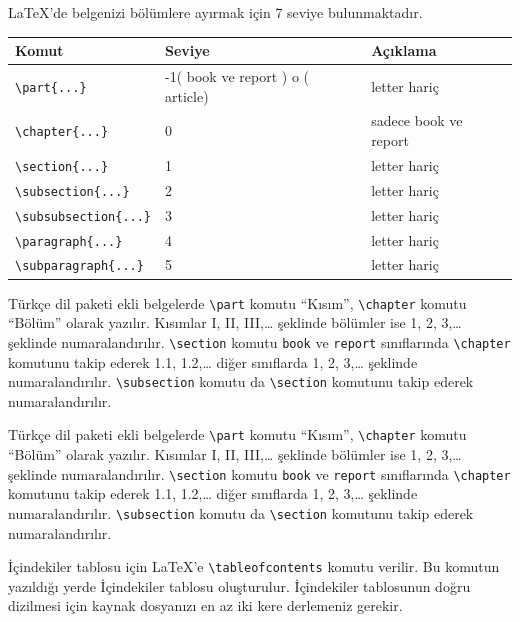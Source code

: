 \documentclass[
  10pt,
]{scrbook}
\begin{document}
LaTeX'de belgenizi bölümlere ayırmak için 7 seviye bulunmaktadır.

\begin{longtable}[]{@{}lll@{}}
\toprule
Komut & Seviye & Açıklama \\
\midrule
\endhead
\texttt{\textbackslash{}part\{...\}} & -1( book ve report ) o ( article) & letter hariç \\
\texttt{\textbackslash{}chapter\{...\}} & 0 & sadece book ve report \\
\texttt{\textbackslash{}section\{...\}} & 1 & letter hariç \\
\texttt{\textbackslash{}subsection\{...\}} & 2 & letter hariç \\
\texttt{\textbackslash{}subsubsection\{...\}} & 3 & letter hariç \\
\texttt{\textbackslash{}paragraph\{...\}} & 4 & letter hariç \\
\texttt{\textbackslash{}subparagraph\{...\}} & 5 & letter hariç \\
\bottomrule
\end{longtable}

Türkçe dil paketi ekli belgelerde \texttt{\textbackslash{}part} komutu ``Kısım'', \texttt{\textbackslash{}chapter}
komutu ``Bölüm'' olarak yazılır. Kısımlar I, II, III,\ldots{} şeklinde bölümler
ise 1, 2, 3,\ldots{} şeklinde numaralandırılır. \texttt{\textbackslash{}section} komutu \texttt{book} ve
\texttt{report} sınıflarında \texttt{\textbackslash{}chapter} komutunu takip ederek 1.1, 1.2,\ldots{}
diğer sınıflarda 1, 2, 3,\ldots{} şeklinde numaralandırılır. \texttt{\textbackslash{}subsection}
komutu da \texttt{\textbackslash{}section} komutunu takip ederek numaralandırılır.

Türkçe dil paketi ekli belgelerde \texttt{\textbackslash{}part} komutu ``Kısım'', \texttt{\textbackslash{}chapter}
komutu ``Bölüm'' olarak yazılır. Kısımlar I, II, III,\ldots{} şeklinde bölümler
ise 1, 2, 3,\ldots{} şeklinde numaralandırılır. \texttt{\textbackslash{}section} komutu \texttt{book} ve
\texttt{report} sınıflarında \texttt{\textbackslash{}chapter} komutunu takip ederek 1.1, 1.2,\ldots{}
diğer sınıflarda 1, 2, 3,\ldots{} şeklinde numaralandırılır. \texttt{\textbackslash{}subsection}
komutu da \texttt{\textbackslash{}section} komutunu takip ederek numaralandırılır.

İçindekiler tablosu için LaTeX'e \texttt{\textbackslash{}tableofcontents} komutu verilir. Bu
komutun yazıldığı yerde İçindekiler tablosu oluşturulur. İçindekiler
tablosunun doğru dizilmesi için kaynak dosyanızı en az iki kere
derlemeniz gerekir.
\end{document}
